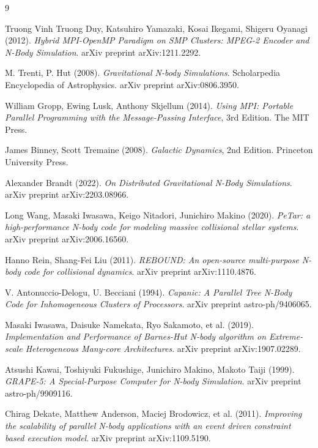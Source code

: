 \documentclass[12pt]{article}
\begin{document}
\newpage
\begin{thebibliography}{9}

Truong Vinh Truong Duy, Katsuhiro Yamazaki, Kosai Ikegami, Shigeru Oyanagi (2012). 
\emph{Hybrid MPI-OpenMP Paradigm on SMP Clusters: MPEG-2 Encoder and N-Body Simulation}. 
arXiv preprint arXiv:1211.2292.

M. Trenti, P. Hut (2008). 
\emph{Gravitational N-body Simulations}. 
Scholarpedia Encyclopedia of Astrophysics. arXiv preprint arXiv:0806.3950.

William Gropp, Ewing Lusk, Anthony Skjellum (2014). 
\emph{Using MPI: Portable Parallel Programming with the Message-Passing Interface}, 3rd Edition. 
The MIT Press.

James Binney, Scott Tremaine (2008).
\emph{Galactic Dynamics}, 2nd Edition.
Princeton University Press.

Alexander Brandt (2022).
\emph{On Distributed Gravitational N-Body Simulations}.
arXiv preprint arXiv:2203.08966.

Long Wang, Masaki Iwasawa, Keigo Nitadori, Junichiro Makino (2020).
\emph{PeTar: a high-performance N-body code for modeling massive collisional stellar systems}.
arXiv preprint arXiv:2006.16560.

Hanno Rein, Shang-Fei Liu (2011).
\emph{REBOUND: An open-source multi-purpose N-body code for collisional dynamics}.
arXiv preprint arXiv:1110.4876.

V. Antonuccio-Delogu, U. Becciani (1994).
\emph{Capanic: A Parallel Tree N-Body Code for Inhomogeneous Clusters of Processors}.
arXiv preprint astro-ph/9406065.

Masaki Iwasawa, Daisuke Namekata, Ryo Sakamoto, et al. (2019).
\emph{Implementation and Performance of Barnes-Hut N-body algorithm on Extreme-scale Heterogeneous Many-core Architectures}.
arXiv preprint arXiv:1907.02289.

Atsushi Kawai, Toshiyuki Fukushige, Junichiro Makino, Makoto Taiji (1999).
\emph{GRAPE-5: A Special-Purpose Computer for N-body Simulation}.
arXiv preprint astro-ph/9909116.

Chirag Dekate, Matthew Anderson, Maciej Brodowicz, et al. (2011).
\emph{Improving the scalability of parallel N-body applications with an event driven constraint based execution model}.
arXiv preprint arXiv:1109.5190.

\end{thebibliography}
\end{document}
